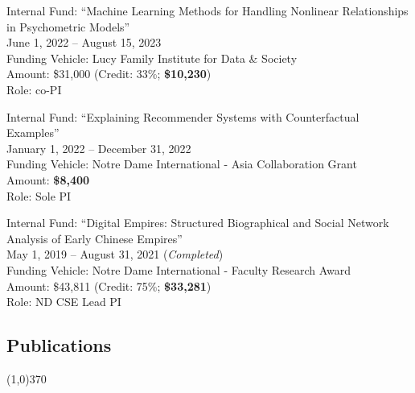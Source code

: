 \documentclass[10pt]{article}
\newenvironment{myindentpar}[1]%
{\begin{list}{}%
         {\setlength{\leftmargin}{#1}}%
         \item[]%
}
{\end{list}}
\newcounter{list}
\begin{document}
\begin{myindentpar}{0.75cm}
\hspace{-0.75cm}Internal Fund: ``Machine Learning Methods for Handling Nonlinear Relationships in Psychometric Models'' \\
June 1, 2022 -- August 15, 2023 \\
Funding Vehicle: Lucy Family Institute for Data \& Society \\
Amount: \$31,000 (Credit: 33\%; \textbf{\$10,230}) \\
Role: {co-PI}

\hspace{-0.75cm}Internal Fund: ``Explaining Recommender Systems with Counterfactual Examples''\\
January 1, 2022 -- December 31, 2022 \\
Funding Vehicle: Notre Dame International - Asia Collaboration Grant \\
Amount: \textbf{\$8,400} \\
Role: {Sole PI}

\hspace{-0.75cm}Internal Fund: ``Digital Empires: Structured Biographical and Social Network Analysis of Early Chinese Empires'' \\
May 1, 2019 -- August 31, 2021 (\emph{Completed}) \\
Funding Vehicle: Notre Dame International - Faculty Research Award \\
Amount: \$43,811 (Credit: 75\%; \textbf{\$33,281}) \\
Role: {ND CSE Lead PI}

\end{myindentpar}

\newpage
\subsection{}
\subsection{\sc Publications}
\vspace{-0.4cm} \line(1,0){370} \vspace{-0.1cm}
\end{document}
